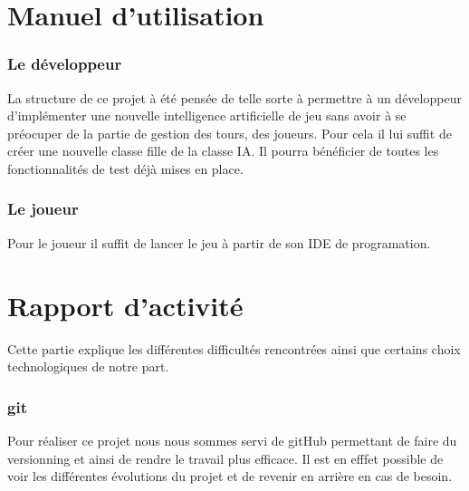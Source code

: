 \documentclass{report}
\begin{document}
\part{Manuel d'utilisation}
	\section{Le développeur}
	La structure de ce projet à été pensée de telle sorte à permettre à un développeur d'implémenter une nouvelle intelligence artificielle de jeu sans avoir à se préocuper de la partie de gestion des tours, des joueurs. Pour cela il lui suffit de créer une nouvelle classe fille de la classe IA. Il pourra bénéficier de toutes les fonctionnalités de test déjà mises en place.
	
	

	\section{Le joueur}
	Pour le joueur il suffit de lancer le jeu à partir de son IDE de programation. 

\part{Rapport d'activité}
Cette partie explique les différentes difficultés rencontrées ainsi que certains choix technologiques de notre part.
\section{git}
Pour réaliser ce projet nous nous sommes servi de gitHub permettant de faire du versionning et ainsi de rendre le travail plus efficace. Il est en efffet possible de voir les différentes évolutions du projet et de revenir en arrière en cas de besoin.
\end{document}

